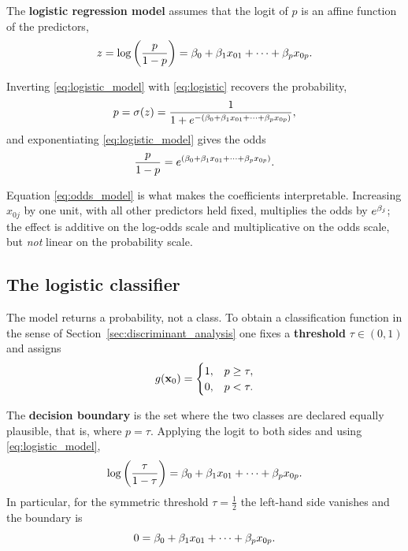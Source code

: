 \begin{definition}
  \label{def:logistic_regression}
  The \textbf{logistic regression model} assumes that the logit of $p$ is an
  affine function of the predictors,
  \begin{equation}
    \label{eq:logistic_model}
    z=\log\left( \frac{p}{1-p} \right)
      =\beta_0+\beta_1x_{01}+\dots+\beta_px_{0p}.
  \end{equation}
\end{definition}

Inverting \eqref{eq:logistic_model} with \eqref{eq:logistic} recovers the
probability,
\begin{equation}
  \label{eq:logistic_probability}
  p=\sigma(z)=\frac{1}{1+e^{-\left(\beta_0+\beta_1x_{01}+\dots+\beta_px_{0p}\right)}},
\end{equation}
and exponentiating \eqref{eq:logistic_model} gives the odds
\begin{equation}
  \label{eq:odds_model}
  \frac{p}{1-p}=e^{\left(\beta_0+\beta_1x_{01}+\dots+\beta_px_{0p}\right)}.
\end{equation}

\begin{remark}
  Equation \eqref{eq:odds_model} is what makes the coefficients interpretable.
  Increasing $x_{0j}$ by one unit, with all other predictors held fixed,
  multiplies the odds by $e^{\beta_j}$; the effect is additive on the log-odds
  scale and multiplicative on the odds scale, but \emph{not} linear on the
  probability scale.
\end{remark}

\subsection{The logistic classifier}
\label{subsec:logistic_classifier}

The model returns a probability, not a class. To obtain a classification
function in the sense of Section~\ref{sec:discriminant_analysis} one fixes a
\textbf{threshold} $\tau\in(0,1)$ and assigns
\begin{equation}
  \label{eq:logistic_rule}
  g(\mathbf{x}_0)=
  \begin{cases}
    1, & p\ge\tau,\\
    0, & p<\tau .
  \end{cases}
\end{equation}

The \textbf{decision boundary} is the set where the two classes are declared
equally plausible, that is, where $p=\tau$. Applying the logit to both sides and
using \eqref{eq:logistic_model},
\begin{equation}
  \label{eq:decision_boundary}
  \log\left( \frac{\tau}{1-\tau} \right)
    =\beta_0+\beta_1x_{01}+\dots+\beta_px_{0p}.
\end{equation}
In particular, for the symmetric threshold $\tau=\tfrac12$ the left-hand side
vanishes and the boundary is
\begin{equation}
  \label{eq:decision_boundary_half}
  0=\beta_0+\beta_1x_{01}+\dots+\beta_px_{0p}.
\end{equation}

